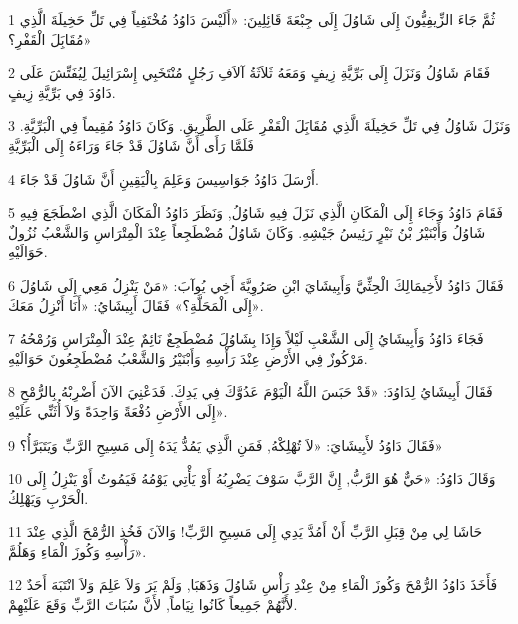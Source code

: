 \par 1 ثُمَّ جَاءَ الزِّيفِيُّونَ إِلَى شَاوُلَ إِلَى جِبْعَةَ قَائِلِينَ: «أَلَيْسَ دَاوُدُ مُخْتَفِياً فِي تَلِّ حَخِيلَةَ الَّذِي مُقَابَِلَ الْقَفْرِ؟»
\par 2 فَقَامَ شَاوُلُ وَنَزَلَ إِلَى بَرِّيَّةِ زِيفٍ وَمَعَهُ ثَلاَثَةُ آلاَفِ رَجُلٍ مُنْتَخَبِي إِسْرَائِيلَ لِيُفَتِّشَ عَلَى دَاوُدَ فِي بَرِّيَّةِ زِيفٍ.
\par 3 وَنَزَلَ شَاوُلُ فِي تَلِّ حَخِيلَةَ الَّذِي مُقَابَِلَ الْقَفْرِ عَلَى الطَّرِيقِ. وَكَانَ دَاوُدُ مُقِيماً فِي الْبَرِّيَّةِ. فَلَمَّا رَأَى أَنَّ شَاوُلَ قَدْ جَاءَ وَرَاءَهُ إِلَى الْبَرِّيَّةِ
\par 4 أَرْسَلَ دَاوُدُ جَوَاسِيسَ وَعَلِمَ بِالْيَقِينِ أَنَّ شَاوُلَ قَدْ جَاءَ.
\par 5 فَقَامَ دَاوُدُ وَجَاءَ إِلَى الْمَكَانِ الَّذِي نَزَلَ فِيهِ شَاوُلُ, وَنَظَرَ دَاوُدُ الْمَكَانَ الَّذِي اضْطَجَعَ فِيهِ شَاوُلُ وَأَبْنَيْرُ بْنُ نَيْرٍ رَئِيسُ جَيْشِهِ. وَكَانَ شَاوُلُ مُضْطَجِعاً عِنْدَ الْمِتْرَاسِ وَالشَّعْبُ نُزُولٌ حَوَالَيْهِ.
\par 6 فَقَالَ دَاوُدُ لأَخِيمَالِكَ الْحِثِّيَّ وَأَبِيشَايَ ابْنِ صَرُوِيَّةَ أَخِي يُوآبَ: «مَنْ يَنْزِلُ مَعِي إِلَى شَاوُلَ إِلَى الْمَحَلَّةِ؟» فَقَالَ أَبِيشَايُ: «أَنَا أَنْزِلُ مَعَكَ».
\par 7 فَجَاءَ دَاوُدُ وَأَبِيشَايُ إِلَى الشَّعْبِ لَيْلاً وَإِذَا بِشَاوُلَ مُضْطَجِعٌ نَائِمٌ عِنْدَ الْمِتْرَاسِ وَرُمْحُهُ مَرْكُوزٌ فِي الأَرْضِ عِنْدَ رَأْسِهِ وَأَبْنَيْرُ وَالشَّعْبُ مُضْطَجِعُونَ حَوَالَيْهِ.
\par 8 فَقَالَ أَبِيشَايُ لِدَاوُدَ: «قَدْ حَبَسَ اللَّهُ الْيَوْمَ عَدُوَّكَ فِي يَدِكَ. فَدَعْنِيَ الآنَ أَضْرِبْهُ بِالرُّمْحِ إِلَى الأَرْضِ دُفْعَةً وَاحِدَةً وَلاَ أُثَنِّي عَلَيْهِ».
\par 9 فَقَالَ دَاوُدُ لأَبِيشَايَ: «لاَ تُهْلِكْهُ, فَمَنِ الَّذِي يَمُدُّ يَدَهُ إِلَى مَسِيحِ الرَّبِّ وَيَتَبَرَّأُ؟»
\par 10 وَقَالَ دَاوُدُ: «حَيٌّ هُوَ الرَّبُّ, إِنَّ الرَّبَّ سَوْفَ يَضْرِبُهُ أَوْ يَأْتِي يَوْمُهُ فَيَمُوتُ أَوْ يَنْزِلُ إِلَى الْحَرْبِ وَيَهْلِكُ.
\par 11 حَاشَا لِي مِنْ قِبَلِ الرَّبِّ أَنْ أَمُدَّ يَدِي إِلَى مَسِيحِ الرَّبِّ! وَالآنَ فَخُذِ الرُّمْحَ الَّذِي عِنْدَ رَأْسِهِ وَكُوزَ الْمَاءِ وَهَلُمَّ».
\par 12 فَأَخَذَ دَاوُدُ الرُّمْحَ وَكُوزَ الْمَاءِ مِنْ عِنْدِ رَأْسِ شَاوُلَ وَذَهَبَا, وَلَمْ يَرَ وَلاَ عَلِمَ وَلاَ انْتَبَهَ أَحَدٌ لأَنَّهُمْ جَمِيعاً كَانُوا نِيَاماً, لأَنَّ سُبَاتَ الرَّبِّ وَقَعَ عَلَيْهِمْ.
